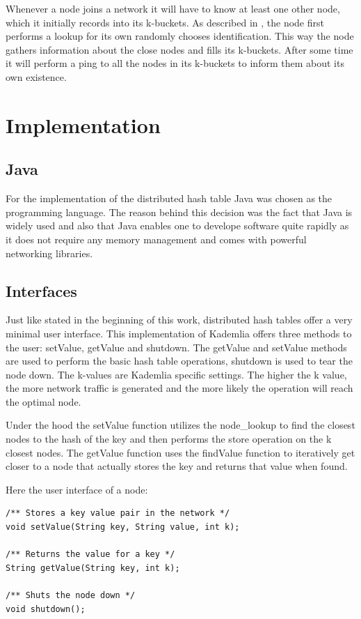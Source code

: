 \documentclass[a4paper, 12pt]{article} %
\begin{document}
Whenever a node joins a network it will have to know at least one other node, which it initially records into its k-buckets. As described in \cite{Maymounkov2002}, the node first performs a lookup for its own randomly chooses identification. This way the node gathers information about the close nodes and fills its k-buckets. After some time it will perform a ping to all the nodes in its k-buckets to inform them about its own existence.

\newpage
\section{Implementation}

\subsection{Java}

For the implementation of the distributed hash table Java was chosen as the programming language. The reason behind this decision was the fact that Java is widely used and also that Java enables one to develope software quite rapidly as it does not require any memory management and comes with powerful networking libraries.

\subsection{Interfaces}

Just like stated in the beginning of this work, distributed hash tables offer a very minimal user interface. This implementation of Kademlia offers three methods to the user: setValue, getValue and shutdown. The getValue and setValue methods are used to perform the basic hash table operations, shutdown is used to tear the node down. The k-values are Kademlia specific settings. The higher the k value, the more network traffic is generated and the more likely the operation will reach the optimal node.

Under the hood the setValue function utilizes the node\_lookup to find the closest nodes to the hash of the key and then performs the store operation on the k closest nodes. The getValue function uses the findValue function to iteratively get closer to a node that actually stores the key and returns that value when found.

Here the user interface of a node:

\begin{verbatim}
/** Stores a key value pair in the network */
void setValue(String key, String value, int k);

/** Returns the value for a key */
String getValue(String key, int k);

/** Shuts the node down */
void shutdown();
\end{verbatim}
\end{document}
